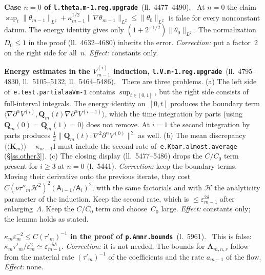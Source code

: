 \documentclass[11pt]{amsart}
\newcommand{\ep}{\varepsilon}
\newcommand{\Id}{\mathrm{I}}
\newcommand{\K}{\mathbf{K}}
\newcommand{\A}{\mathbf{A}}
\newcommand{\Q}{\mathbf{Q}}
\newcommand{\Ln}[1]{l.~#1}
\newcommand{\Lns}[1]{ll.~#1}
\newcommand{\lab}[1]{\texttt{#1}}
\theoremstyle{remark}
\newenvironment{erratum}[2]{\par\smallskip\noindent\textbf{#1}\ {\small(#2)}.\ }{\par}
\begin{document}
\begin{erratum}{Case $n=0$ of \lab{l.theta.m-1.reg.upgrade}}{\Lns{4477--4490}}
At $n=0$ the claim $\sup_t\|\theta_{m-1}\|_{L^2}+\kappa_{m-1}^{1/2}\|\nabla\theta_{m-1}\|_{L^2}\leq\|\theta_0\|_{L^2}$ is false for every nonconstant datum. The energy identity gives only $(1+2^{-1/2})\|\theta_0\|_{L^2}$. The normalization $D_0\leq1$ in the proof (\Lns{4632--4680}) inherits the error. \emph{Correction:} put a factor~$2$ on the right side for all~$n$. \emph{Effect:} constants only.
\end{erratum}

\begin{erratum}{Energy estimates in the $V^{(i)}_{m-1}$ induction, \lab{l.V.m-1.reg.upgrade}}{\Lns{4795--4830}, \Lns{5105--5132}, \Lns{5464--5486}}
There are three problems. (a) The left side of~\lab{e.test.partialaaVm-1} contains $\sup_{t\in[0,1]}$, but the right side consists of full-interval integrals. The energy identity on~$[0,t]$ produces the boundary term $\langle\nabla\partial^\alpha V^{(i)},\Q_m(t)\nabla\partial^\alpha V^{(i-1)}\rangle$, which the time integration by parts (using $\Q_m(0)=\Q_m(1)=0$) does not remove. At $i=1$ the second integration by parts produces $\frac12\|\Q_m(t):\nabla^2\partial^\alpha V^{(0)}\|^2$ as well. (b) The mean discrepancy $\langle\!\langle\K_m\rangle\!\rangle-\kappa_{m-1}\Id$ must include the second rate of~\lab{e.Kbar.almost.average} (\S\ref{ss.other3}). (c) The closing display (\Lns{5477--5486}) drops the $C/C_0$ term present for $i\geq3$ at $n=0$ (\Ln{5441}). \emph{Correction:} keep the boundary terms. Moving their derivative onto the previous iterate, they cost $C(\nu\tau''_m\mathcal H^2)^2(\mathsf A_{i-1}/\mathsf A_i)^2$, with the same factorials and with $\mathcal H$ the analyticity parameter of the induction. Keep the second rate, which is $\leq\ep_{m-1}^{2\delta}$ after enlarging~$\Lambda$. Keep the $C/C_0$ term and choose~$C_0$ large. \emph{Effect:} constants only; the lemma holds as stated.
\end{erratum}

\begin{erratum}{$\kappa_m\ep_m^{-2}\leq C(\tau'_m)^{-1}$ in the proof of \lab{p.Amnr.bounds}}{\Ln{5961}}
This is false: $\kappa_m\tau'_m/\ep_m^2\simeq\ep_{m-1}^{-5\delta}$. \emph{Correction:} it is not needed. The bounds for $\A_{m,n,r}$ follow from the material rate $(\tau'_m)^{-1}$ of the coefficients and the rate $a_{m-1}$ of the flow. \emph{Effect:} none.
\end{erratum}
\end{document}
